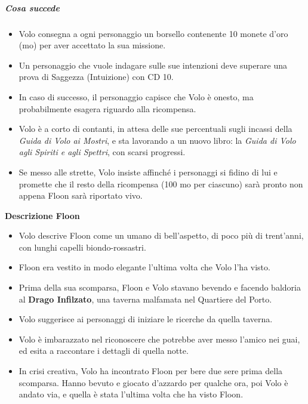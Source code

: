 \documentclass{article}
\begin{document}
\subparagraph{Cosa succede} \begin{itemize}
    \item Volo consegna a ogni personaggio un borsello contenente 10 monete d'oro (mo) per aver accettato la sua missione.
    \item Un personaggio che vuole indagare sulle sue intenzioni deve superare una prova di Saggezza (Intuizione) con CD 10.
    \item In caso di successo, il personaggio capisce che Volo è onesto, ma probabilmente esagera riguardo alla ricompensa.
    \item Volo è a corto di contanti, in attesa delle sue percentuali sugli incassi della \textit{Guida di Volo ai Mostri}, e sta lavorando a un nuovo libro: la \textit{Guida di Volo agli Spiriti e agli Spettri}, con scarsi progressi.
    \item Se messo alle strette, Volo insiste affinché i personaggi si fidino di lui e promette che il resto della ricompensa (100 mo per ciascuno) sarà pronto non appena Floon sarà riportato vivo.
\end{itemize}
\textbf{Descrizione Floon} 
\begin{itemize}
    \item Volo descrive Floon come un umano di bell'aspetto, di poco più di trent'anni, con lunghi capelli biondo-rossastri.
    \item Floon era vestito in modo elegante l'ultima volta che Volo l'ha visto.
    \item Prima della sua scomparsa, Floon e Volo stavano bevendo e facendo baldoria al \textbf{Drago Infilzato}, una taverna malfamata nel Quartiere del Porto.
    \item Volo suggerisce ai personaggi di iniziare le ricerche da quella taverna.
    \item Volo è imbarazzato nel riconoscere che potrebbe aver messo l'amico nei guai, ed esita a raccontare i dettagli di quella notte.
    \item In crisi creativa, Volo ha incontrato Floon per bere due sere prima della scomparsa. Hanno bevuto e giocato d'azzardo per qualche ora, poi Volo è andato via, e quella è stata l'ultima volta che ha visto Floon.
\end{itemize}
\end{document}
